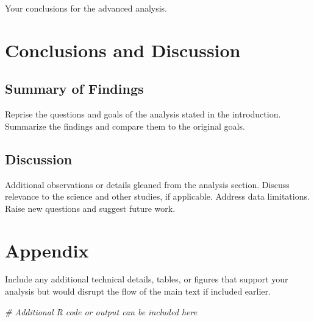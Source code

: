 \documentclass[
]{article}
\newenvironment{Shaded}{\begin{snugshade}}{\end{snugshade}}
\newcommand{\CommentTok}[1]{\textcolor[rgb]{0.56,0.35,0.01}{\textit{#1}}}
\begin{document}
Your conclusions for the advanced analysis.

\section{Conclusions and Discussion}\label{conclusions-and-discussion}

\subsection{Summary of Findings}\label{summary-of-findings}

Reprise the questions and goals of the analysis stated in the
introduction. Summarize the findings and compare them to the original
goals.

\subsection{Discussion}\label{discussion}

Additional observations or details gleaned from the analysis section.
Discuss relevance to the science and other studies, if applicable.
Address data limitations. Raise new questions and suggest future work.

\section{Appendix}\label{appendix}

Include any additional technical details, tables, or figures that
support your analysis but would disrupt the flow of the main text if
included earlier.

\begin{Shaded}
\begin{Highlighting}[]
\CommentTok{\# Additional R code or output can be included here}
\end{Highlighting}
\end{Shaded}
\end{document}
